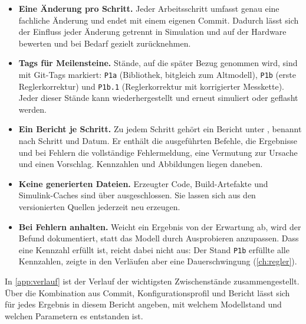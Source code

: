 \begin{itemize}
  \item \textbf{Eine Änderung pro Schritt.} Jeder Arbeitsschritt umfasst genau eine
    fachliche Änderung und endet mit einem eigenen Commit. Dadurch lässt sich der Einfluss
    jeder Änderung getrennt in Simulation und auf der Hardware bewerten und bei Bedarf
    gezielt zurücknehmen.
  \item \textbf{Tags für Meilensteine.} Stände, auf die später Bezug genommen wird, sind mit
    Git-Tags markiert: \texttt{P1a} (Bibliothek, bitgleich zum Altmodell), \texttt{P1b}
    (erste Reglerkorrektur) und \texttt{P1b.1} (Reglerkorrektur mit korrigierter Messkette).
    Jeder dieser Stände kann wiederhergestellt und erneut simuliert oder geflasht werden.
  \item \textbf{Ein Bericht je Schritt.} Zu jedem Schritt gehört ein Bericht unter
    , benannt nach Schritt und Datum. Er enthält die ausgeführten
    Befehle, die Ergebnisse und bei Fehlern die vollständige Fehlermeldung, eine Vermutung
    zur Ursache und einen Vorschlag. Kennzahlen und Abbildungen liegen daneben.
  \item \textbf{Keine generierten Dateien.} Erzeugter Code, Build-Artefakte und
    Simulink-Caches sind über  ausgeschlossen. Sie lassen sich aus den
    versionierten Quellen jederzeit neu erzeugen.
  \item \textbf{Bei Fehlern anhalten.} Weicht ein Ergebnis von der Erwartung ab, wird der
    Befund dokumentiert, statt das Modell durch Ausprobieren anzupassen. Dass eine Kennzahl
    erfüllt ist, reicht dabei nicht aus: Der Stand \texttt{P1b} erfüllte alle Kennzahlen,
    zeigte in den Verläufen aber eine Dauerschwingung (\cref{ch:regler}).
\end{itemize}

In \cref{app:verlauf} ist der Verlauf der wichtigsten Zwischenstände zusammengestellt. Über die
Kombination aus Commit, Konfigurationsprofil und Bericht lässt sich für jedes Ergebnis in
diesem Bericht angeben, mit welchem Modellstand und welchen Parametern es entstanden ist.

